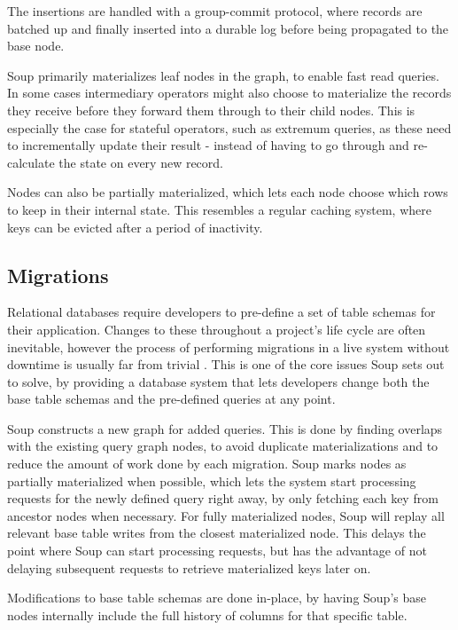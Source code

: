 \documentclass[b5paper]{report}
\begin{document}
The insertions are handled with a group-commit protocol, where records are
batched up and finally inserted into a durable log before being propagated to
the base node.

Soup primarily materializes leaf nodes in the graph, to enable fast read
queries. In some cases intermediary operators might also choose to materialize
the records they receive before they forward them through to their child nodes.
This is especially the case for stateful operators, such as extremum queries, as
these need to incrementally update their result - instead of having to go
through and re-calculate the state on every new record.

Nodes can also be partially materialized, which lets each node choose which rows
to keep in their internal state. This resembles a regular caching system, where
keys can be evicted after a period of inactivity.

\subsection{Migrations}
Relational databases require developers to pre-define a set of table schemas for
their application. Changes to these throughout a project's life cycle are often
inevitable, however the process of performing migrations in a live
system without downtime is usually far from trivial \cite{stripe}. This is one
of the core issues Soup sets out to solve, by providing a database system that
lets developers change both the base table schemas and the pre-defined queries
at any point.

Soup constructs a new graph for added queries. This is done by finding overlaps
with the existing query graph nodes, to avoid duplicate materializations and
to reduce the amount of work done by each migration. Soup marks nodes as
partially materialized when possible, which lets the system start processing
requests for the newly defined query right away, by only fetching each key from
ancestor nodes when necessary. For fully materialized nodes, Soup will replay
all relevant base table writes from the closest materialized node. This
delays the point where Soup can start processing requests, but has the advantage
of not delaying subsequent requests to retrieve materialized keys later on.

Modifications to base table schemas are done in-place, by having Soup's base
nodes internally include the full history of columns for that specific table.
\end{document}
